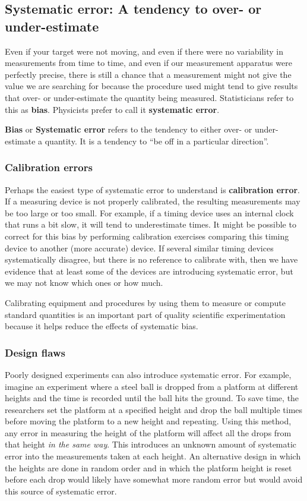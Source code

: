 \documentclass[twoside]{book}\usepackage[]{graphicx}\usepackage[]{xcolor}
\def\term#1{\textbf{#1}}
\newlength{\tempfmlength}
\newenvironment{fmpage}[1]
     {
	 \medskip
	 \setlength{\tempfmlength}{#1}
	 \begin{lrbox}{\fmbox}
	   \begin{minipage}{#1}
		 \vspace*{.02\tempfmlength}
		 \hfill
	   \begin{minipage}{.95 \tempfmlength}}
		 {\end{minipage}\hfill
		 \vspace*{.015\tempfmlength}
		 \end{minipage}\end{lrbox}\fbox{\usebox{\fmbox}}
	 \medskip
	 }
\newenvironment{boxedText}[1][.98\textwidth]%
{%
\begin{center}
\begin{fmpage}{#1}
}%
{%
\end{fmpage}
\end{center}
}
\newcounter{example}[section]
\begin{document}
\subsection{Systematic error: A tendency to over- or under-estimate}
Even if your target were not moving, and even if there were no 
variability in measurements from time to time, and even if our measurement
apparatus were perfectly precise, there is still
a chance that a measurement might not give the value we are searching 
for because the procedure used might tend to give results that over-
or under-estimate the quantity being measured.  Statisticians refer to this
as \term{bias}.  Physicists prefer to call it \term{systematic error}.


\begin{boxedText}
	\term{Bias} or \term{Systematic error} refers to the tendency 
to either over- or under-estimate a quantity.  It is a tendency to ``be off 
in a particular direction''.
\end{boxedText}

\subsubsection{Calibration errors}
Perhaps the easiest type of systematic error to understand is \textbf{calibration error}.
If a measuring device is not properly calibrated, the resulting measurements may be 
too large or too small.
For example, if a timing device uses an internal clock that runs a bit slow, it will
tend to underestimate times.  It might be possible to correct for this bias by
performing calibration exercises comparing this timing device to another 
(more accurate) device.  If several similar timing devices systematically
disagree, but there is no reference to calibrate with, then we have evidence
that at least some of the devices are introducing systematic error, but we may
not know which ones or how much.

Calibrating equipment and procedures by using them to measure or compute
standard quantities is an important part of quality scientific experimentation
because it helps reduce the effects of systematic bias.  


\subsubsection{Design flaws}

Poorly designed experiments can also introduce systematic error.  For example,
imagine an experiment where a steel ball is dropped from a platform at
different heights and the time is recorded until the ball hits the ground.  
To save time, the researchers set the platform at a specified height and drop the ball
multiple times before moving the platform to a new height and repeating.
Using this method, any error in measuring the height of the platform will affect all
the drops from that height \emph{in the same way}.  This introduces an unknown amount
of systematic error into the measurements taken at each height.  An alternative design
in which the heights are done in random order and in which the platform height is 
reset before each drop would likely have somewhat more random error but would avoid this
source of systematic error.
\end{document}
